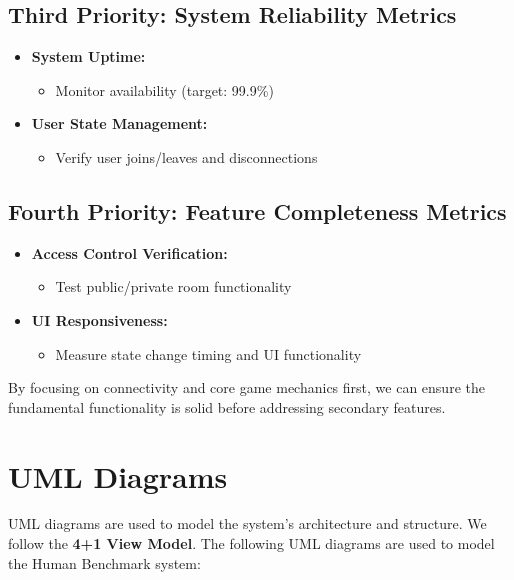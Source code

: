 \documentclass[]{VUMIFTemplateClass}
\begin{document}
\subsection{Third Priority: System Reliability Metrics}
\begin{itemize}
\item 	\textbf{System Uptime:}
\begin{itemize}
\item Monitor availability (target: 99.9\%)
\end{itemize}
\item 	\textbf{User State Management:}
\begin{itemize}
\item Verify user joins/leaves and disconnections
\end{itemize}
\end{itemize}

\subsection{Fourth Priority: Feature Completeness Metrics}
\begin{itemize}
\item 	\textbf{Access Control Verification:}
\begin{itemize}
\item Test public/private room functionality
\end{itemize}
\item 	\textbf{UI Responsiveness:}
\begin{itemize}
\item Measure state change timing and UI functionality
\end{itemize}
\end{itemize}

By focusing on connectivity and core game mechanics first, we can ensure the fundamental functionality is solid before addressing secondary features.





\section{UML Diagrams}
UML diagrams are used to model the system's architecture and structure. We follow the \textbf{4+1 View Model}. 
The following UML diagrams are used to model the Human Benchmark system:
\end{document}
